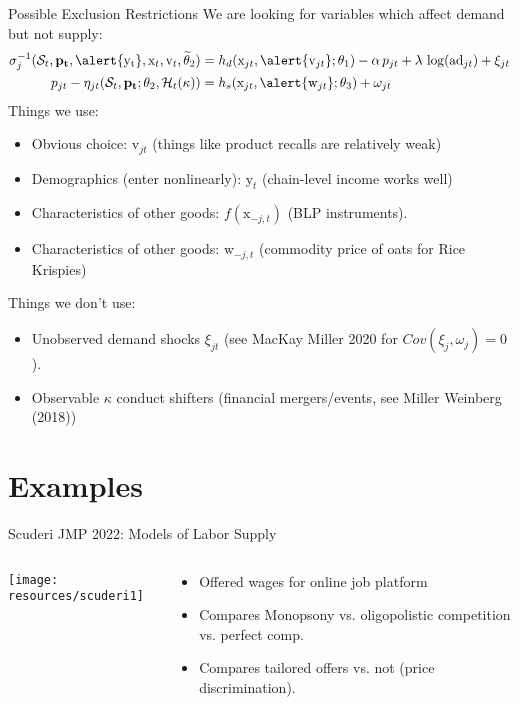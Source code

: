 \begin{frame}{Possible Exclusion Restrictions}
We are looking for variables which affect \alert{demand but not supply}:
\begin{align*}
\sigma_{j}^{-1}(\mathcal{S}_t, \mathbf{p_t},\alert{\mathrm{y_t}}, \mathrm{x}_t,  \mathrm{v}_t, \widetilde{\theta}_2) 
&= h_d(\mathrm{x}_{jt},\alert{ \mathrm{v}_{jt}}; \theta_1) - \alpha\, p_{jt} + \lambda \, \log(\text{ad}_{jt})+ \xi_{jt} \\
p_{jt} - \eta_{jt}(\mathcal{S}_t, \mathbf{p_t}; \theta_2, \mathcal{H}_t(\kappa))
&= h_s(\textrm{x}_{jt}, \alert{\mathrm{w}_{jt}}; \theta_3) + \omega_{jt} 
\end{align*}
Things we use:
\begin{itemize}
    \item Obvious choice: $\mathrm{v}_{jt}$ (things like product recalls are relatively weak)
    \item Demographics (enter nonlinearly): $\mathrm{y}_t$ (chain-level income works well)
    \item Characteristics of other goods: $f(\mathrm{x}_{-j,t})$ (BLP instruments).
    \item Characteristics of other goods: $\mathrm{w}_{-j,t}$ (commodity price of oats for Rice Krispies)
\end{itemize}

Things we don't use:
\begin{itemize}
    \item Unobserved demand shocks $\xi_{jt}$ (see MacKay Miller 2020 for $Cov(\xi_j,\omega_j)=0$).
    \item Observable $\kappa$ conduct shifters (financial mergers/events, see Miller Weinberg (2018))
\end{itemize}
\end{frame}


\section{Examples}


\begin{frame}{Scuderi JMP 2022: Models of Labor Supply}
\begin{columns}
\begin{column}{0.7\textwidth}
\texttt{[image: resources/scuderi1]}
\end{column}
\begin{column}{0.3\textwidth}
\begin{itemize}
\item Offered wages for online job platform
\item Compares Monopsony vs. oligopolistic competition vs. perfect comp.
\item Compares tailored offers vs. not (price discrimination).
\end{itemize}
\end{column}
\end{columns}
\end{frame}


